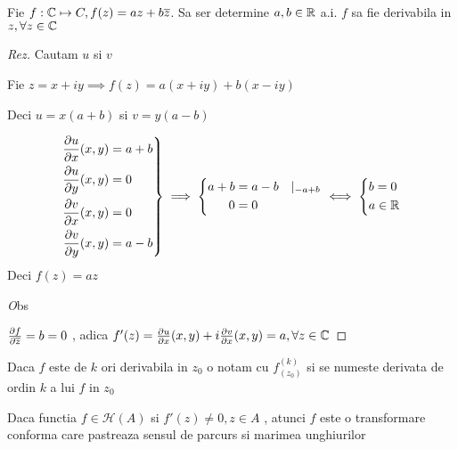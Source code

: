 \begin{example}
	Fie $f:\mathbb{C} \mapsto C, f(z) = az + b\overline{z}$. Sa ser determine $a,b \in \mathbb{R}$ a.i.
	$f$ sa fie derivabila in $z, \forall z \in \mathbb{C}$
	\begin{proof}[Rez]
		Cautam $u$ si $v$

		Fie $z=x+iy \implies f(z) = a(x+iy) + b(x-iy)$

		Deci $u=x(a+b)$ si  $v=y(a-b)$

		\begin{displaymath}
			\left.
				\begin{aligned}
					\frac{\partial u}{\partial x} (x,y) &=  a+b \\
					\frac{\partial u}{\partial y} (x,y) &= 0    \\
					\frac{\partial v}{\partial x} (x,y) &= 0    \\
					\frac{\partial v}{\partial y} (x,y) &= a-b \\
				\end{aligned}
			\right \}
			\implies
			\left \{
				\begin{aligned}
					a+b &= a-b \quad |_{-a + b}   \\
					0 &=0
				\end{aligned}
			\right.
			\iff
			\left \{
				\begin{aligned}
					&b = 0   \\
					&a \in \mathbb{R}
				\end{aligned}
			\right.
		\end{displaymath}
		Deci $f(z) = az$

		\emph Obs

		$\frac{\partial f}{\partial{\overline{z}}} = b = 0$ , adica
		$f'(z) = \frac{\partial u}{\partial x}(x,y) +
		i\frac{\partial v}{\partial x}(x,y) = a, \forall z \in \mathbb{C} $

	\end{proof}
\end{example}

\begin{observation}
	Daca $f$ este de $k$ ori derivabila in $z_0$ o notam cu $f^{(k)}_{(z_{0})}$
	si se numeste derivata de ordin $k$ a lui $f$ in $z_0$
\end{observation}

\begin{observation}
	Daca functia $f \in \mathcal{H}(A)$ si $f'(z) \neq 0, z \in A$ , atunci
	$f$ este o transformare conforma care pastreaza sensul de parcurs si
	marimea unghiurilor
\end{observation}

